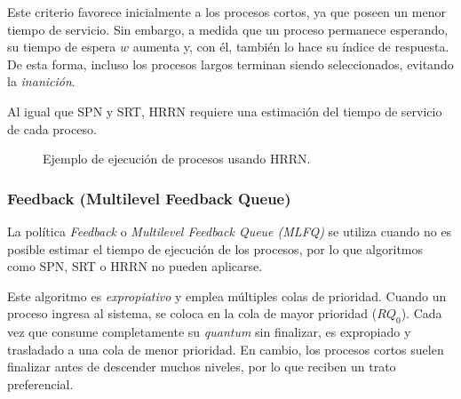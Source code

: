 Este criterio favorece inicialmente a los procesos cortos, ya que poseen un menor tiempo de servicio. Sin embargo, a medida que un proceso permanece esperando, su tiempo de espera \(w\) aumenta y, con él, también lo hace su índice de respuesta. De esta forma, incluso los procesos largos terminan siendo seleccionados, evitando la \textit{inanición}.

Al igual que SPN y SRT, HRRN requiere una estimación del tiempo de servicio de cada proceso.

\begin{figure}[!ht]
  \centering
  \caption{Ejemplo de ejecución de procesos usando HRRN.}
\end{figure}

\subsubsection{Feedback (Multilevel Feedback Queue)}

La política \textit{Feedback} o \textit{Multilevel Feedback Queue (MLFQ)} se utiliza cuando no es posible estimar el tiempo de ejecución de los procesos, por lo que algoritmos como SPN, SRT o HRRN no pueden aplicarse.

Este algoritmo es \textit{expropiativo} y emplea múltiples colas de prioridad. Cuando un proceso ingresa al sistema, se coloca en la cola de mayor prioridad (\(RQ_0\)). Cada vez que consume completamente su \textit{quantum} sin finalizar, es expropiado y trasladado a una cola de menor prioridad. En cambio, los procesos cortos suelen finalizar antes de descender muchos niveles, por lo que reciben un trato preferencial.

